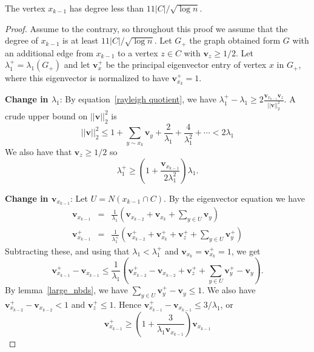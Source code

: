 \begin{lemma}\label{k_1_pre_lemma}
 The vertex $x_{k-1}$ has degree less than $11 |C| / \sqrt{\log n}$.  
\end{lemma}
\begin{proof}
  Assume to the contrary, so throughout this proof we assume that
  the degree of $x_{k-1}$ is at least $11 |C| / \sqrt{\log n}$.
  Let $G_+$ the graph obtained form $G$ with
  an additional edge from $x_{k-1}$ to a vertex $z \in C$ with $\mathbf{v}_z \geq 1/2$.
  Let $\lambda^+_1 = \lambda_1(G_+)$ and  let $\mathbf{v}_{x}^+$ be the principal eigenvector
  entry of vertex $x$ in $G_+$, where this eigenvector is normalized to have
  $\mathbf{v}_{x_{k}}^+ = 1$.


  \noindent \textbf{Change in $\lambda_1$}: By equation~\ref{rayleigh quotient}, we
  have $\lambda_1^+ - \lambda_1 \geq 2 \frac{\mathbf{v}_{x_{k-1}} \mathbf{v}_z}{||\mathbf{v}||^2_2}$.
  A crude upper bound on $||\mathbf{v}||_2^2$ is
   \[ ||\mathbf{v}||_2^2 \leq 1 + \sum_{y \sim x_{k}} \mathbf{v}_y + \frac{2}{\lambda_1} + \frac{4}{\lambda_1^2} + \cdots < 2 \lambda_1 \]
  We also have that $\mathbf{v}_z \geq 1/2$ so
   \[ \lambda_1^+ \geq \left( 1 + \frac{\mathbf{v}_{x_{k-1}}}{2\lambda_1^2} \right) \lambda_1 .\]

  \noindent \textbf{Change in $\mathbf{v}_{x_{k-1}}$}:  Let $U = N(x_{k-1} \cap C)$.
  By the eigenvector equation we have
  \begin{eqnarray*}
    \mathbf{v}_{x_{k-1}} & = & \frac{1}{\lambda_1} \left( \mathbf{v}_{x_{k-2}} + \mathbf{v}_{x_{k}} + \sum_{y \in U} \mathbf{v}_y \right) \\
    \mathbf{v}_{x_{k-1}}^+ & = & \frac{1}{\lambda_1^+} \left( \mathbf{v}_{x_{k-2}}^+ + \mathbf{v}_{x_{k}}^+ + \mathbf{v}_z^+ + \sum_{y \in U} \mathbf{v}_y^+ \right)    
  \end{eqnarray*}
  Subtracting these, and using that $\lambda_1 < \lambda_1^+$ and $\mathbf{v}_{x_k} = \mathbf{v}_{x_k}^+ = 1$, we get
   \[ \mathbf{v}_{x_{k-1}}^+ - \mathbf{v}_{x_{k-1}} \leq \frac{1}{\lambda_1} \left( \mathbf{v}_{x_{k-2}}^+ - \mathbf{v}_{x_{k-2}} + \mathbf{v}_{z}^+ + \sum_{y \in U} \mathbf{v}_{y}^+ - \mathbf{v}_{y}\right) .\]
  By lemma~\ref{large_nbds}, we have $\sum_{y \in U} \mathbf{v}_{y}^+ - \mathbf{v}_y \leq 1$.  We also have
  $\mathbf{v}_{x_{k-2}}^+ - \mathbf{v}_{x_{k-2}} < 1$ and $\mathbf{v}_z^+ \leq 1$.  Hence
  $\mathbf{v}_{x_{k-1}}^+ - \mathbf{v}_{x_{k-1}} \leq 3 / \lambda_1$,
  or
   \[ \mathbf{v}_{x_{k-1}}^+ \geq \left( 1 + \frac{3}{\lambda_1 \mathbf{v}_{x_{k-1}}} \right) \mathbf{v}_{x_{k-1}}\]



\end{proof}
